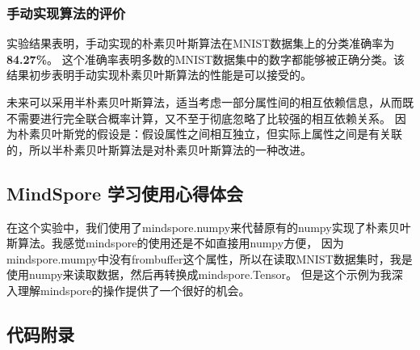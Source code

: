\documentclass[12pt]{article}
\begin{document}
\subsubsection{手动实现算法的评价}

实验结果表明，手动实现的朴素贝叶斯算法在MNIST数据集上的分类准确率为\textbf{84.27\%}。
这个准确率表明多数的MNIST数据集中的数字都能够被正确分类。该结果初步表明手动实现朴素贝叶斯算法的性能是可以接受的。

未来可以采用半朴素贝叶斯算法，适当考虑一部分属性间的相互依赖信息，从而既不需要进行完全联合概率计算，又不至于彻底忽略了比较强的相互依赖关系。
因为朴素贝叶斯党的假设是：假设属性之间相互独立，但实际上属性之间是有关联的，所以半朴素贝叶斯算法是对朴素贝叶斯算法的一种改进。


\subsection{MindSpore 学习使用心得体会}
在这个实验中，我们使用了mindspore.numpy来代替原有的numpy实现了朴素贝叶斯算法。我感觉mindspore的使用还是不如直接用numpy方便，
因为mindspore.mumpy中没有frombuffer这个属性，所以在读取MNIST数据集时，我是使用numpy来读取数据，然后再转换成mindspore.Tensor。
但是这个示例为我深入理解mindspore的操作提供了一个很好的机会。


\subsection{代码附录}
\end{document}
